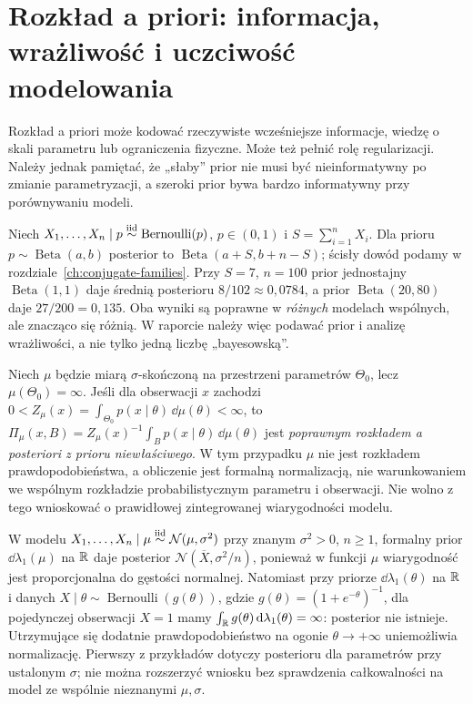 \section{Rozkład a priori: informacja, wrażliwość i uczciwość modelowania}
Rozkład a priori może kodować rzeczywiste wcześniejsze informacje,
wiedzę o skali parametru lub ograniczenia fizyczne. Może też pełnić rolę
regularizacji. Należy jednak pamiętać, że „słaby” prior nie musi być
nieinformatywny po zmianie parametryzacji, a szeroki prior bywa
bardzo informatywny przy porównywaniu modeli.

\begin{przyklad}
Niech $X_1,\ldots,X_n\mid p\mathrel{\overset{\mathrm{iid}}\sim}\operatorname{Bernoulli}(p)$,
$p\in(0,1)$ i $S=\sum_{i=1}^nX_i$. Dla prioru $p\sim
\operatorname{Beta}(a,b)$ posterior to $\operatorname{Beta}(a+S,b+n-S)$;
ścisły dowód podamy w rozdziale~\ref{ch:conjugate-families}.
Przy $S=7$, $n=100$ prior jednostajny $\operatorname{Beta}(1,1)$
daje średnią posterioru $8/102\approx0{,}0784$, a prior
$\operatorname{Beta}(20,80)$ daje $27/200=0{,}135$.
Oba wyniki są poprawne w \emph{różnych} modelach wspólnych, ale
znacząco się różnią. W raporcie należy więc podawać prior i
analizę wrażliwości, a nie tylko jedną liczbę „bayesowską”.
\end{przyklad}

\begin{definicja}
Niech $\mu$ będzie miarą $\sigma$-skończoną na przestrzeni
parametrów $\Theta_0$, lecz $\mu(\Theta_0)=\infty$.
Jeśli dla obserwacji $x$ zachodzi
$0<Z_\mu(x)=\int_{\Theta_0}p(x\mid\theta)\,\dd\mu(\theta)<\infty$,
to $\Pi_\mu(x,B)=Z_\mu(x)^{-1}\int_B p(x\mid\theta)\,\dd\mu(\theta)$
jest \emph{poprawnym rozkładem a posteriori z prioru niewłaściwego}.
W tym przypadku $\mu$ nie jest rozkładem prawdopodobieństwa,
a obliczenie jest formalną normalizacją, nie warunkowaniem we wspólnym
rozkładzie probabilistycznym parametru i obserwacji. Nie wolno z tego
wnioskować o prawidłowej zintegrowanej wiarygodności modelu.
\end{definicja}

\begin{przyklad}
W modelu $X_1,\ldots,X_n\mid\mu\mathrel{\overset{\mathrm{iid}}\sim}\mathcal N(\mu,\sigma^2)$
przy znanym $\sigma^2>0$, $n\ge1$, formalny prior
$\dd\lambda_1(\mu)$ na $\mathbb R$ daje posterior
$\mathcal N(\overline X,\sigma^2/n)$, ponieważ w funkcji $\mu$
wiarygodność jest proporcjonalna do gęstości normalnej.
Natomiast przy priorze $\dd\lambda_1(\theta)$ na $\mathbb R$ i danych
$X\mid\theta\sim\operatorname{Bernoulli}(g(\theta))$, gdzie
$g(\theta)=(1+e^{-\theta})^{-1}$, dla pojedynczej obserwacji
$X=1$ mamy $\int_\mathbb R g(\theta)\,\mathrm d\lambda_1(\theta)=\infty$:
posterior nie istnieje. Utrzymujące się dodatnie prawdopodobieństwo
na ogonie $\theta\to+\infty$ uniemożliwia normalizację.
Pierwszy z przykładów dotyczy posterioru dla parametrów przy
ustalonym $\sigma$; nie można rozszerzyć wniosku bez sprawdzenia
całkowalności na model ze wspólnie nieznanymi $\mu,\sigma$.
\end{przyklad}

